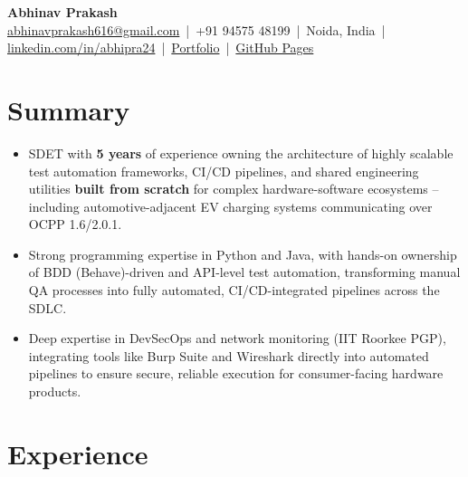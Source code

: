 \documentclass[a4paper,10pt]{article}
\begin{document}
\begin{center}
    {\Huge \textbf{Abhinav Prakash}}\\[4pt]
    \href{mailto:abhinavprakash616@gmail.com}{abhinavprakash616@gmail.com} \,|\,
    +91 94575 48199 \,|\,
    Noida, India \,|\,
    \href{https://linkedin.com/in/abhipra24}{linkedin.com/in/abhipra24} \,|\,
    \href{https://abhinavprakash.streamlit.app/}{Portfolio} \,|\,
    \href{https://abhipra24.github.io/streamlit-resume/}{GitHub Pages}
\end{center}

\section{Summary}
\begin{itemize}
    \item SDET with \textbf{5 years} of experience owning the architecture of highly scalable test automation frameworks, CI/CD pipelines, and shared engineering utilities \textbf{built from scratch} for complex hardware-software ecosystems -- including automotive-adjacent EV charging systems communicating over OCPP 1.6/2.0.1.
    \item Strong programming expertise in Python and Java, with hands-on ownership of BDD (Behave)-driven and API-level test automation, transforming manual QA processes into fully automated, CI/CD-integrated pipelines across the SDLC.
    \item Deep expertise in DevSecOps and network monitoring (IIT Roorkee PGP), integrating tools like Burp Suite and Wireshark directly into automated pipelines to ensure secure, reliable execution for consumer-facing hardware products.
\end{itemize}

\section{Experience}
\end{document}
